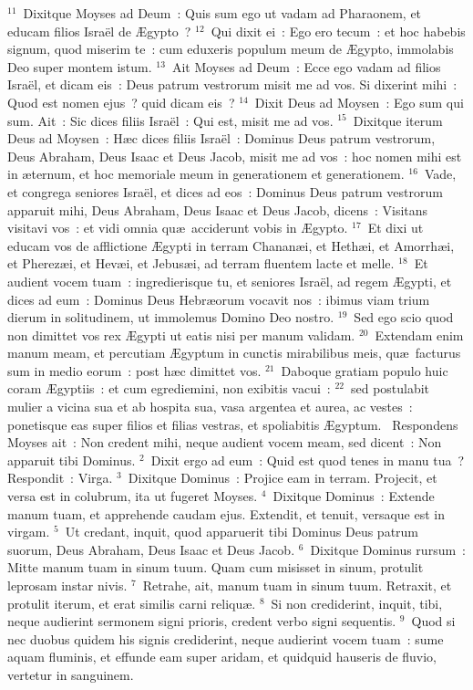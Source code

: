 ${}^{11}$~Dixitque Moyses ad Deum~: Quis sum ego ut vadam ad Pharaonem, et educam filios Isra\"el de \AE gypto~?
${}^{12}$~Qui dixit ei~: Ego ero tecum~: et hoc habebis signum, quod miserim te~: cum eduxeris populum meum de \AE gypto, immolabis Deo super montem istum.
${}^{13}$~Ait Moyses ad Deum~: Ecce ego vadam ad filios Isra\"el, et dicam eis~: Deus patrum vestrorum misit me ad vos. Si dixerint mihi~: Quod est nomen ejus~? quid dicam eis~?
${}^{14}$~Dixit Deus ad Moysen~: Ego sum qui sum. Ait~: Sic dices filiis Isra\"el~: Qui est, misit me ad vos.
${}^{15}$~Dixitque iterum Deus ad Moysen~: H\ae c dices filiis Isra\"el~: Dominus Deus patrum vestrorum, Deus Abraham, Deus Isaac et Deus Jacob, misit me ad vos~: hoc nomen mihi est in \ae ternum, et hoc memoriale meum in generationem et generationem.
${}^{16}$~Vade, et congrega seniores Isra\"el, et dices ad eos~: Dominus Deus patrum vestrorum apparuit mihi, Deus Abraham, Deus Isaac et Deus Jacob, dicens~: Visitans visitavi vos~: et vidi omnia qu\ae\ acciderunt vobis in \AE gypto.
${}^{17}$~Et dixi ut educam vos de afflictione \AE gypti in terram Chanan\ae i, et Heth\ae i, et Amorrh\ae i, et Pherez\ae i, et Hev\ae i, et Jebus\ae i, ad terram fluentem lacte et melle.
${}^{18}$~Et audient vocem tuam~: ingredierisque tu, et seniores Isra\"el, ad regem \AE gypti, et dices ad eum~: Dominus Deus Hebr\ae orum vocavit nos~: ibimus viam trium dierum in solitudinem, ut immolemus Domino Deo nostro.
${}^{19}$~Sed ego scio quod non dimittet vos rex \AE gypti ut eatis nisi per manum validam.
${}^{20}$~Extendam enim manum meam, et percutiam \AE gyptum in cunctis mirabilibus meis, qu\ae\ facturus sum in medio eorum~: post h\ae c dimittet vos.
${}^{21}$~Daboque gratiam populo huic coram \AE gyptiis~: et cum egrediemini, non exibitis vacui~:
${}^{22}$~sed postulabit mulier a vicina sua et ab hospita sua, vasa argentea et aurea, ac vestes~: ponetisque eas super filios et filias vestras, et spoliabitis \AE gyptum.
~\lettrine[lines=10,image=true,loversize=0.05,lraise=-0.03]{R}{}espondens Moyses ait~: Non credent mihi, neque audient vocem meam, sed dicent~: Non apparuit tibi Dominus.
${}^{2}$~Dixit ergo ad eum~: Quid est quod tenes in manu tua~? Respondit~: Virga.
${}^{3}$~Dixitque Dominus~: Projice eam in terram. Projecit, et versa est in colubrum, ita ut fugeret Moyses.
${}^{4}$~Dixitque Dominus~: Extende manum tuam, et apprehende caudam ejus. Extendit, et tenuit, versaque est in virgam.
${}^{5}$~Ut credant, inquit, quod apparuerit tibi Dominus Deus patrum suorum, Deus Abraham, Deus Isaac et Deus Jacob.
${}^{6}$~Dixitque Dominus rursum~: Mitte manum tuam in sinum tuum. Quam cum misisset in sinum, protulit leprosam instar nivis.
${}^{7}$~Retrahe, ait, manum tuam in sinum tuum. Retraxit, et protulit iterum, et erat similis carni reliqu\ae .
${}^{8}$~Si non crediderint, inquit, tibi, neque audierint sermonem signi prioris, credent verbo signi sequentis.
${}^{9}$~Quod si nec duobus quidem his signis crediderint, neque audierint vocem tuam~: sume aquam fluminis, et effunde eam super aridam, et quidquid hauseris de fluvio, vertetur in sanguinem.


